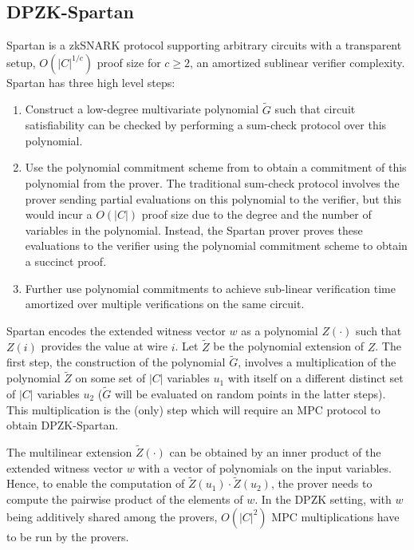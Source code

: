 \subsection{DPZK-Spartan}
Spartan \cite{spartan} is a zkSNARK protocol supporting arbitrary circuits with a transparent setup, $O(|C|^{1/c})$ proof size for $c \geq 2$, an amortized sublinear verifier complexity. Spartan has three high level steps:
\begin{enumerate}
\item Construct a low-degree multivariate polynomial $\tilde{G}$ such that circuit satisfiability can be checked by performing a sum-check protocol \cite{sumcheck} over this polynomial.
\item Use the polynomial commitment scheme from \cite{hyrax} to obtain a commitment of this polynomial from the prover. The traditional sum-check protocol involves the prover sending partial evaluations on this polynomial to the verifier, but this would incur a $O(|C|)$ proof size due to the degree and the number of variables in the polynomial. Instead, the Spartan prover proves these evaluations to the verifier using the polynomial commitment scheme to obtain a succinct proof.
\item Further use polynomial commitments to achieve sub-linear verification time amortized over multiple verifications on the same circuit.
\end{enumerate}
Spartan encodes the extended witness vector $w$ as a polynomial $Z(\cdot)$ such that $Z(i)$ provides the value at wire $i$. Let $\tilde{Z}$ be the polynomial extension of $Z$.
The first step, the construction of the polynomial $\tilde{G}$, involves a multiplication of the polynomial $\tilde{Z}$ on some set of $|C|$ variables $u_1$ with itself on a different distinct set of $|C|$ variables $u_2$ ($\tilde{G}$ will be evaluated on random points in the latter steps). This multiplication is the (only) step which will require an MPC protocol to obtain DPZK-Spartan. 

The multilinear extension $\tilde{Z}(\cdot)$ can be obtained by an inner product of the extended witness vector $w$ with a vector of polynomials on the input variables. Hence, to enable the computation of $\tilde{Z}(u_1) \cdot \tilde{Z}(u_2)$, the prover needs to compute the pairwise product of the elements of $w$. In the DPZK setting, with $w$ being additively shared among the provers, $O(|C|^2)$ MPC multiplications have to be run by the provers. 

